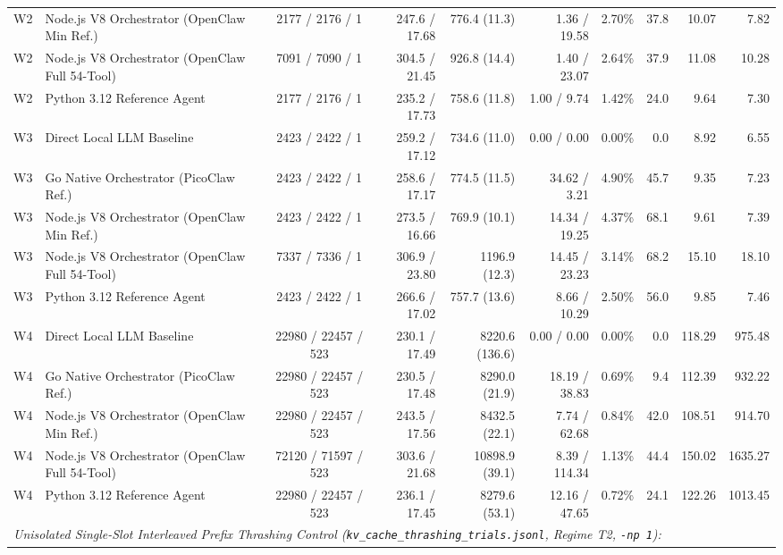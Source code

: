 \begin{table}[t]
\begin{tabular}{l l c r r r r r r r}
W2 & Node.js V8 Orchestrator (OpenClaw Min Ref.) & 2177 / 2176 / 1 & 247.6 / 17.68 & 776.4 (11.3) & 1.36 / 19.58 & 2.70\% & 37.8 & 10.07 & 7.82 \\
W2 & Node.js V8 Orchestrator (OpenClaw Full 54-Tool) & 7091 / 7090 / 1 & 304.5 / 21.45 & 926.8 (14.4) & 1.40 / 23.07 & 2.64\% & 37.9 & 11.08 & 10.28 \\
W2 & Python 3.12 Reference Agent & 2177 / 2176 / 1 & 235.2 / 17.73 & 758.6 (11.8) & 1.00 / 9.74 & 1.42\% & 24.0 & 9.64 & 7.30 \\
\hline
W3 & Direct Local LLM Baseline & 2423 / 2422 / 1 & 259.2 / 17.12 & 734.6 (11.0) & 0.00 / 0.00 & 0.00\% & 0.0 & 8.92 & 6.55 \\
W3 & Go Native Orchestrator (PicoClaw Ref.) & 2423 / 2422 / 1 & 258.6 / 17.17 & 774.5 (11.5) & 34.62 / 3.21 & 4.90\% & 45.7 & 9.35 & 7.23 \\
W3 & Node.js V8 Orchestrator (OpenClaw Min Ref.) & 2423 / 2422 / 1 & 273.5 / 16.66 & 769.9 (10.1) & 14.34 / 19.25 & 4.37\% & 68.1 & 9.61 & 7.39 \\
W3 & Node.js V8 Orchestrator (OpenClaw Full 54-Tool) & 7337 / 7336 / 1 & 306.9 / 23.80 & 1196.9 (12.3) & 14.45 / 23.23 & 3.14\% & 68.2 & 15.10 & 18.10 \\
W3 & Python 3.12 Reference Agent & 2423 / 2422 / 1 & 266.6 / 17.02 & 757.7 (13.6) & 8.66 / 10.29 & 2.50\% & 56.0 & 9.85 & 7.46 \\
\hline
W4 & Direct Local LLM Baseline & 22980 / 22457 / 523 & 230.1 / 17.49 & 8220.6 (136.6) & 0.00 / 0.00 & 0.00\% & 0.0 & 118.29 & 975.48 \\
W4 & Go Native Orchestrator (PicoClaw Ref.) & 22980 / 22457 / 523 & 230.5 / 17.48 & 8290.0 (21.9) & 18.19 / 38.83 & 0.69\% & 9.4 & 112.39 & 932.22 \\
W4 & Node.js V8 Orchestrator (OpenClaw Min Ref.) & 22980 / 22457 / 523 & 243.5 / 17.56 & 8432.5 (22.1) & 7.74 / 62.68 & 0.84\% & 42.0 & 108.51 & 914.70 \\
W4 & Node.js V8 Orchestrator (OpenClaw Full 54-Tool) & 72120 / 71597 / 523 & 303.6 / 21.68 & 10898.9 (39.1) & 8.39 / 114.34 & 1.13\% & 44.4 & 150.02 & 1635.27 \\
W4 & Python 3.12 Reference Agent & 22980 / 22457 / 523 & 236.1 / 17.45 & 8279.6 (53.1) & 12.16 / 47.65 & 0.72\% & 24.1 & 122.26 & 1013.45 \\
\hline
\multicolumn{10}{l}{\textit{Unisolated Single-Slot Interleaved Prefix Thrashing Control (\texttt{kv\_cache\_thrashing\_trials.jsonl}, Regime T2, \texttt{-np 1}):}} \\

\end{tabular}
\end{table}
